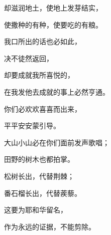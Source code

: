 {\par }{\Q 却滋润地土，使地上发芽结实，
\par }{\Q 使撒种的有种，使要吃的有粮。
\par }{\Q {}我口所出的话也必如此，
\par }{\Q 决不徒然返回，
\par }{\Q 却要成就我所喜悦的，
\par }{\Q 在我发他去成就的事上必然亨通。
\par }{\Q {}你们必欢欢喜喜而出来，
\par }{\Q 平平安安蒙引导。
\par }{\Q 大山小山必在你们面前发声歌唱；
\par }{\Q 田野的树木也都拍掌。
\par }{\Q {}松树长出，代替荆棘；
\par }{\Q 番石榴长出，代替蒺藜。
\par }{\Q 这要为耶和华留名，
\par }{\Q 作为永远的证据，不能剪除。

}

